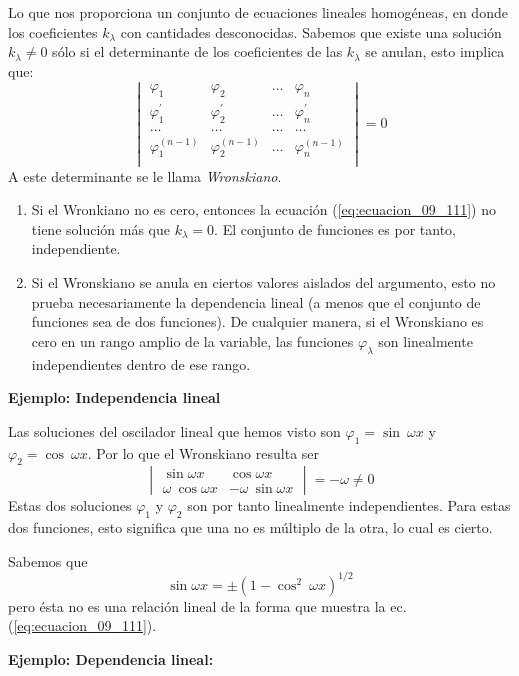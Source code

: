 Lo que nos proporciona un conjunto de ecuaciones lineales homogéneas, en donde los coeficientes $k_{\lambda}$ con cantidades desconocidas. Sabemos que existe una solución $k_{\lambda} \neq 0$ sólo si el determinante de los coeficientes de las $k_{\lambda}$ se anulan, esto implica que:
\begin{equation}
\begin{vmatrix}
\varphi_{1} & \varphi_{2} & \ldots & \varphi_{n} \\
\varphi^{\prime}_{1} & \varphi^{\prime}_{2} & \ldots & \varphi^{\prime}_{n} \\
\ldots & \ldots & \ldots & \ldots \\
\varphi^{(n-1)}_{1} & \varphi^{(n-1)}_{2} & \ldots & \varphi^{(n-1)}_{n} \\
\end{vmatrix} = 0
\label{eq:ecuacion_09_116}
\end{equation}
A este determinante se le llama \emph{Wronskiano}.
\begin{enumerate}
\item Si el Wronkiano no es cero, entonces la ecuación (\ref{eq:ecuacion_09_111}) no tiene solución más que $k_{\lambda}=0$. El conjunto de funciones es por tanto, independiente.
\item Si el Wronskiano se anula en ciertos valores aislados del argumento, esto no prueba necesariamente la dependencia lineal (a menos que el conjunto de funciones sea de dos funciones). De cualquier manera, si el Wronskiano es cero en un rango amplio de la variable, las funciones $\varphi_{\lambda}$ son linealmente independientes dentro de ese rango.
\end{enumerate}
\par
\textbf{Ejemplo: Independencia lineal} 

Las soluciones del oscilador lineal que hemos visto son $\varphi_{1} = \sin \: \omega x$ y $\varphi_{2} = \cos \: \omega x$. Por lo que el Wronskiano resulta ser
\[ \begin{vmatrix}
\sin \omega x & \cos \omega x \\
\omega \: \cos \omega x & - \omega \: \sin \omega x
\end{vmatrix} = -\omega \neq 0 \]
Estas dos soluciones $\varphi_{1}$ y $\varphi_{2}$ son por tanto linealmente independientes. Para estas dos funciones, esto significa que una no es múltiplo de la otra, lo cual es cierto.
\par
Sabemos que
\[ \sin \omega x = \pm (1 - \cos^{2} \: \omega x)^{1/2} \]
pero ésta no es una relación lineal de la forma que muestra la ec. (\ref{eq:ecuacion_09_111}).
\par
\textbf{Ejemplo: Dependencia lineal:}

